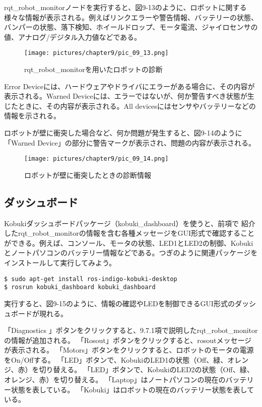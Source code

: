 \begin{itemize}
rqt\_robot\_monitorノードを実行すると、図9-13のように、ロボットに関する様々な情報が表示される。例えばリンクエラーや警告情報、バッテリーの状態、バンパーの状態、落下検知、ホイールドロップ、モータ電流、ジャイロセンサの値、アナログ/デジタル入力値などである。

\begin{figure}[htp]
  \centering
  \texttt{[image: pictures/chapter9/pic\_09\_13.png]}
  \caption{rqt\_robot\_monitorを用いたロボットの診断}
\end{figure}

Error Deviceには、ハードウェアやドライバにエラーがある場合に、その内容が表示される。Warned Deviceには、エラーではないが、何か警告すべき状態が生じたときに、その内容が表示される。All devicesにはセンサやバッテリーなどの情報を示される。

ロボットが壁に衝突した場合など、何か問題が発生すると、図9-14のように「Warned Device」の部分に警告マークが表示され、問題の内容が表示される。

\begin{figure}[htp]
  \centering
  \texttt{[image: pictures/chapter9/pic\_09\_14.png]}
  \caption{ロボットが壁に衝突したときの診断情報}
\end{figure}

\subsection{ダッシュボード}

Kobukiダッシュボードパッケージ（kobuki\_dashboard）を使うと、前項で   紹介したrqt\_robot\_monitorの情報を含む各種メッセージをGUI形式で確認することができる。例えば、コンソール、モータの状態、LED1とLED2の制御、Kobukiとノートパソコンのバッテリー情報などである。つぎのように関連パッケージをインストールして実行してみよう。

\begin{lstlisting}[language=ROS]
$ sudo apt-get install ros-indigo-kobuki-desktop
$ rosrun kobuki_dashboard kobuki_dashboard
\end{lstlisting}

実行すると、図9-15のように、情報の確認やLEDを制御できるGUI形式のダッシュボードが現れる。

\setcounter{num}{0}
\circled{\thenum} 「Diagnostics   」ボタンをクリックすると、9.7.1項で説明したrqt\_robot\_monitor\\の情報が追加される。
\circled{\thenum}「Rosout」ボタンをクリックすると、rosoutメッセージが表示される。
\circled{\thenum}「Motors」ボタンをクリックすると、ロボットのモータの電源をOn/Offする。
\circled{\thenum}「LED」ボタンで、KobukiのLED1の状態（Off、緑、オレンジ、赤）を切り替える。
\circled{\thenum}「LED」ボタンで、KobukiのLED2の状態（Off、緑、オレンジ、赤）を切り替える。
\circled{\thenum}「Laptop」はノートパソコンの現在のバッテリー状態を表している。
\circled{\thenum}「Kobuki」はロボットの現在のバッテリー状態を表している。


\end{itemize}
